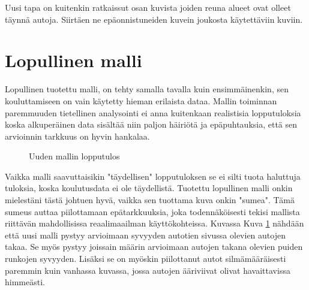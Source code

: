 Uusi tapa on kuitenkin ratkaissut osan kuvista joiden reuna alueet ovat olleet täynnä autoja. Siirtäen ne epäonnistuneiden kuvein joukosta käytettäviin kuviin.

\section{Lopullinen malli}

Lopullinen tuotettu malli, on tehty samalla tavalla kuin ensimmäinenkin, 
sen kouluttamiseen on vain käytetty hieman erilaista dataa.
Mallin toiminnan paremmuuden tietellinen analysointi ei anna kuitenkaan realistisia lopputuloksia 
koska alkuperäinen data sisältää niin paljon häiriötä ja epäpuhtauksia, että sen arvioinnin tarkkuus on hyvin hankalaa.

\begin{figure}[h]
\centering
{}
\caption{Uuden mallin lopputulos}
\label{fig:uusi_malli}
\end{figure}


Vaikka malli saavuttaisikin "täydellisen" lopputuloksen se ei silti tuota haluttuja tuloksia, koska koulutusdata ei ole täydellistä.
Tuotettu lopullinen malli onkin mielestäni tästä johtuen hyvä, vaikka sen tuottama kuva onkin "sumea". 
Tämä sumeus auttaa piilottamaan epätarkkuuksia, joka todennäköisesti tekisi mallista riittävän mahdollisissa reaalimaailman käyttökohteissa.
Kuvassa Kuva \ref{fig:uusi_malli} nähdään että uusi malli pystyy arvioimaan syvyyden autotien sivussa olevien autojen takaa. 
Se myös pystyy joissain määrin arvioimaan autojen takana olevien puiden runkojen syvyyden. 
Lisäksi se on myöskin piilottanut autot silmämääräisesti paremmin kuin vanhassa kuvassa, jossa autojen ääriviivat olivat havaittavissa himmeästi.
